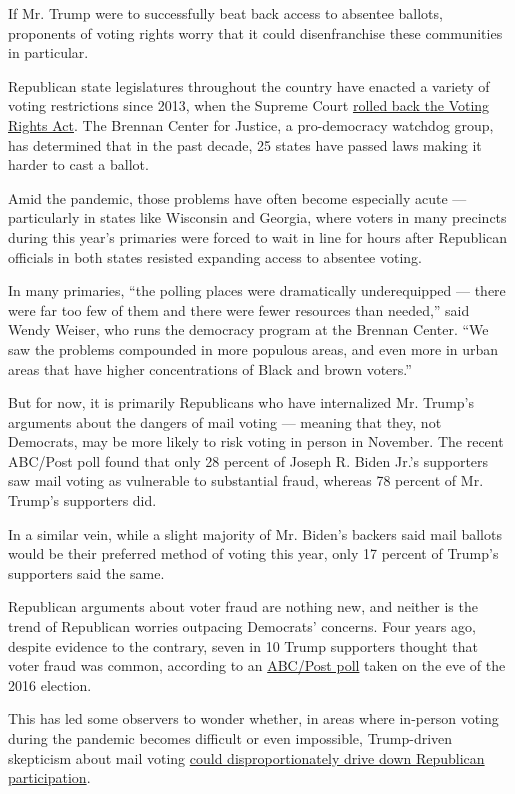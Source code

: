 If Mr. Trump were to successfully beat back access to absentee ballots,
proponents of voting rights worry that it could disenfranchise these
communities in particular.

Republican state legislatures throughout the country have enacted a
variety of voting restrictions since 2013, when the Supreme Court
\href{https://www.nytimes.com/2013/06/26/us/supreme-court-ruling.html}{rolled
back the Voting Rights Act}. The Brennan Center for Justice, a
pro-democracy watchdog group, has determined that in the past decade, 25
states have passed laws making it harder to cast a ballot.

Amid the pandemic, those problems have often become especially acute ---
particularly in states like Wisconsin and Georgia, where voters in many
precincts during this year's primaries were forced to wait in line for
hours after Republican officials in both states resisted expanding
access to absentee voting.

In many primaries, ``the polling places were dramatically underequipped
--- there were far too few of them and there were fewer resources than
needed,'' said Wendy Weiser, who runs the democracy program at the
Brennan Center. ``We saw the problems compounded in more populous areas,
and even more in urban areas that have higher concentrations of Black
and brown voters.''

But for now, it is primarily Republicans who have internalized Mr.
Trump's arguments about the dangers of mail voting --- meaning that
they, not Democrats, may be more likely to risk voting in person in
November. The recent ABC/Post poll found that only 28 percent of Joseph
R. Biden Jr.'s supporters saw mail voting as vulnerable to substantial
fraud, whereas 78 percent of Mr. Trump's supporters did.

In a similar vein, while a slight majority of Mr. Biden's backers said
mail ballots would be their preferred method of voting this year, only
17 percent of Trump's supporters said the same.

Republican arguments about voter fraud are nothing new, and neither is
the trend of Republican worries outpacing Democrats' concerns. Four
years ago, despite evidence to the contrary, seven in 10 Trump
supporters thought that voter fraud was common, according to an
\href{https://www.langerresearch.com/wp-content/uploads/1184a62016ElectionTrackingNo-6.pdf}{ABC/Post
poll} taken on the eve of the 2016 election.

This has led some observers to wonder whether, in areas where in-person
voting during the pandemic becomes difficult or even impossible,
Trump-driven skepticism about mail voting
\href{https://www.nytimes.com/2020/06/02/us/politics/republicans-mail-voting-trump.html}{could
disproportionately drive down Republican participation}.

